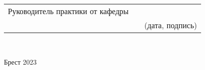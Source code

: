   
  \noindent
 \begin{tabular}{lp{5em}l} 
 Руководитель практики от кафедры   & \hspace{1 mm} \\\cline{3-3} 
   \hspace{5  cm}    && \footnotesize{(дата, подпись)}
  \end{tabular} \\ 

  \begin{center}
      Брест 2023
  \end{center}
    

                                                                    





